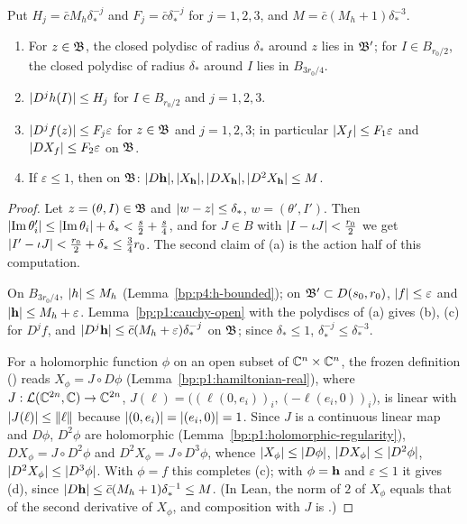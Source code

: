 \begin{lemma}\label{bp:p4:derivative-bounds}
Put $H_j=\bar cM_h\delta_*^{-j}$ and $F_j=\bar c\delta_*^{-j}$ for $j=1,2,3$, and
$M=\bar c(M_h+1)\delta_*^{-3}$.
\begin{enumerate}[label=(\alph*)]
\item For $z\in\mathfrak{B}$, the closed polydisc of radius $\delta_*$ around $z$ lies in $\mathfrak{B}'$; for
  $I\in B_{r_0/2}$, the closed polydisc of radius $\delta_*$ around $I$ lies in $B_{3r_0/4}$.
\item $\lvert D^jh(I)\rvert\le H_j$ for $I\in B_{r_0/2}$ and $j=1,2,3$.
\item $\lvert D^jf(z)\rvert\le F_j\varepsilon$ for $z\in\mathfrak{B}$ and $j=1,2,3$; in particular
  $\lvert X_f\rvert\le F_1\varepsilon$ and $\lvert DX_f\rvert\le F_2\varepsilon$ on $\mathfrak{B}$.
\item If $\varepsilon\le1$, then on $\mathfrak{B}$:
  $\lvert D\mathbf{h}\rvert,\lvert X_{\mathbf{h}}\rvert,\lvert DX_{\mathbf{h}}\rvert,\lvert D^2X_{\mathbf{h}}\rvert\le M$.
\end{enumerate}
\end{lemma}

\begin{proof}
\label{step:p4:db-polydisc}
Let $z=(\theta,I)\in\mathfrak{B}$ and $\lvert w-z\rvert\le\delta_*$, $w=(\theta',I')$. Then
$\lvert \operatorname{Im}\theta'_i\rvert\le\lvert \operatorname{Im}\theta_i\rvert+\delta_*<\frac s2+\frac s4$, and
for $J\in B$ with $\lvert I-\iota J\rvert<\frac{r_0}2$ we get $\lvert I'-\iota J\rvert<\frac{r_0}2+\delta_*\le\frac34r_0$.
The second claim of (a) is the action half of this computation.

\label{step:p4:db-cauchy}
On $B_{3r_0/4}$, $\lvert h\rvert\le M_h$ (Lemma~\ref{bp:p4:h-bounded}); on $\mathfrak{B}'\subset D(s_0,r_0)$,
$\lvert f\rvert\le\varepsilon$ and $\lvert \mathbf{h}\rvert\le M_h+\varepsilon$. Lemma~\ref{bp:p1:cauchy-open} with the
polydiscs of (a) gives (b), (c) for $D^jf$, and $\lvert D^j\mathbf{h}\rvert\le\bar c(M_h+\varepsilon)\delta_*^{-j}$ on
$\mathfrak{B}$; since $\delta_*\le1$, $\delta_*^{-j}\le\delta_*^{-3}$.

\label{step:p4:db-vectorfield}
For a holomorphic function $\phi$ on an open subset of $\mathbb{C}^n\times\mathbb{C}^n$, the frozen definition
() reads $X_\phi=J\circ D\phi$
(Lemma~\ref{bp:p1:hamiltonian-real}), where
$J:\mathcal L(\mathbb{C}^{2n},\mathbb{C})\to\mathbb{C}^{2n}$, $J(\ell)=\bigl((\ell(0,e_i))_i,(-\ell(e_i,0))_i\bigr)$, is
linear with $\lvert J(\ell)\rvert\le\lVert \ell\rVert$ because $\lvert (0,e_i)\rvert=\lvert (e_i,0)\rvert=1$. Since $J$ is a
continuous linear map and $D\phi$, $D^2\phi$ are holomorphic (Lemma~\ref{bp:p1:holomorphic-regularity}),
$DX_\phi=J\circ D^2\phi$ and $D^2X_\phi=J\circ D^3\phi$, whence
$\lvert X_\phi\rvert\le\lvert D\phi\rvert$, $\lvert DX_\phi\rvert\le\lvert D^2\phi\rvert$, $\lvert D^2X_\phi\rvert\le\lvert D^3\phi\rvert$.
With $\phi=f$ this completes (c); with $\phi=\mathbf{h}$ and $\varepsilon\le1$ it gives (d), since
$\lvert D\mathbf{h}\rvert\le\bar c(M_h+1)\delta_*^{-1}\le M$. (In Lean, the norm of
 $2$ of $X_\phi$ equals that of the second derivative of $X_\phi$, and
composition with $J$ is .)
\end{proof}

